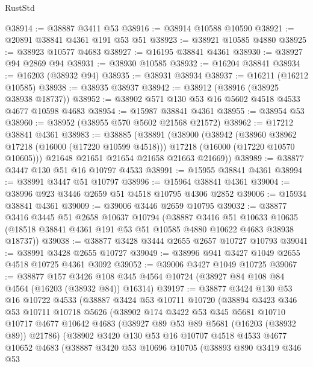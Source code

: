 \begin{lexlean}{RustStd}
\begin{coremodule}
@38914 := @38887 @3411 @53
@38916 := @38914 @10588 @10590
@38921 := @20891 @38841 @4361 @191 @53 @51
@38923 := @38921 @10585 @4880
@38925 := @38923 @10577 @4683
@38927 := @16195 @38841 @4361
@38930 := @38927 @94 @2869 @94
@38931 := @38930 @10585
@38932 := @16204 @38841
@38934 := @16203 (@38932 @94)
@38935 := @38931 @38934
@38937 := @16211 (@16212 @10585)
@38938 := @38935 @38937
@38942 := @38912 (@38916 (@38925 @38938 @18737))
@38952 := @38902 @571 @130 @53 @16 @5602 @4518 @4533 @4677 @10598 @4683
@38954 := @15987 @38841 @4361
@38955 := @38954 @53
@38960 := @38952 (@38955 @570 @5602 @21568 @21572)
@38962 := @17212 @38841 @4361
@38983 := @38885
    (@38891
      (@38900
        (@38942
          (@38960 @38962 @17218 (@16000 (@17220 @10599 @4518)))
          @17218
          (@16000 (@17220 @10570 @10605)))
        @21648
        @21651
        @21654
        @21658
        @21663
        @21669))
@38989 := @38877 @3447 @130 @51 @16 @10797 @4533
@38991 := @15955 @38841 @4361
@38994 := @38991 @3447 @51 @10797
@38996 := @15964 @38841 @4361
@39004 := @38996 @923 @3446 @2659 @51 @4518 @10795 @4306 @2852
@39006 := @15934 @38841 @4361
@39009 := @39006 @3446 @2659 @10795
@39032 := @38877
    @3416
    @3445
    @51
    @2658
    @10637
    @10794
    (@38887
      @3416
      @51
      @10633
      @10635
      (@18518 @38841 @4361 @191 @53 @51 @10585 @4880 @10622 @4683 @38938 @18737))
@39038 := @38877 @3428 @3444 @2655 @2657 @10727 @10793
@39041 := @38991 @3428 @2655 @10727
@39049 := @38996 @941 @3427 @1049 @2655 @4518 @10725 @4361 @3092
@39052 := @39006 @3427 @1049 @10725
@39067 := @38877
    @157
    @3426
    @108
    @345
    @4564
    @10724
    (@38927 @84 @108 @84 @4564 (@16203 (@38932 @84)) @16314)
@39197 := @38877
    @3424
    @130
    @53
    @16
    @10722
    @4533
    (@38887
      @3424
      @53
      @10711
      @10720
      (@38894
        @3423
        @346
        @53
        @10711
        @10718
        @5626
        (@38902
          @174
          @3422
          @53
          @345
          @5681
          @10710
          @10717
          @4677
          @10642
          @4683
          (@38927 @89 @53 @89 @5681 (@16203 (@38932 @89)) @21786)
          (@38902
            @3420
            @130
            @53
            @16
            @10707
            @4518
            @4533
            @4677
            @10652
            @4683
            (@38887
              @3420
              @53
              @10696
              @10705
              (@38893
                @890
                @3419
                @346
                @53

\end{coremodule}
\end{lexlean}
